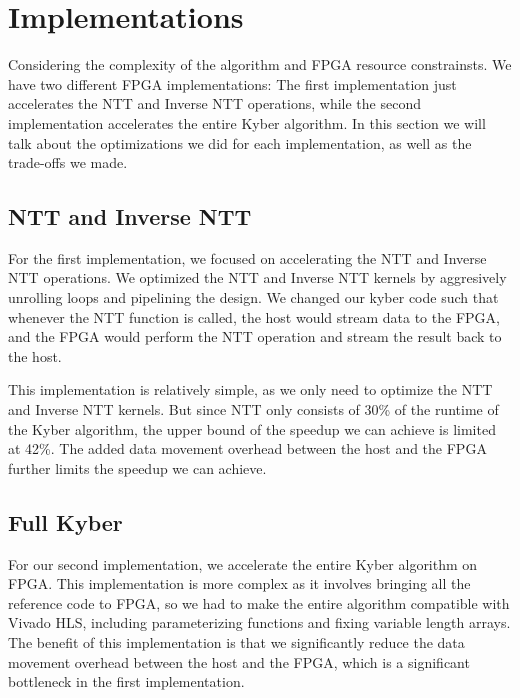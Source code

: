 
\section*{Implementations}

Considering the complexity of the algorithm and FPGA resource constrainsts.
We have two different FPGA implementations: The first implementation just accelerates the NTT and Inverse 
NTT operations, while the second implementation accelerates the entire Kyber algorithm. 
In this section we will talk about the optimizations we did for each implementation, as well as the trade-offs we made.

\subsection{NTT and Inverse NTT}
For the first implementation, we focused on accelerating the NTT and Inverse NTT operations. 
We optimized the NTT and Inverse NTT kernels by aggresively unrolling loops and pipelining the design.
We changed our kyber code such that whenever the NTT function is called, the host would stream data to the FPGA, 
and the FPGA would perform the NTT operation and stream the result back to the host.

This implementation is relatively simple, as we only need to optimize the NTT and Inverse NTT kernels. But since NTT 
only consists of 30\% of the runtime of the Kyber algorithm, the upper bound of the speedup we can achieve is limited
at 42\%. The added data movement overhead between the host and the FPGA further limits the speedup we can achieve.

\subsection{Full Kyber}
For our second implementation, we accelerate the entire Kyber algorithm on FPGA.
This implementation is more complex as it involves bringing all the reference code to FPGA, 
so we had to make the entire algorithm compatible with Vivado HLS, including parameterizing 
functions and fixing variable length arrays. The benefit of this implementation is that we significantly reduce the data
movement overhead between the host and the FPGA, which is a significant bottleneck in the first implementation.

